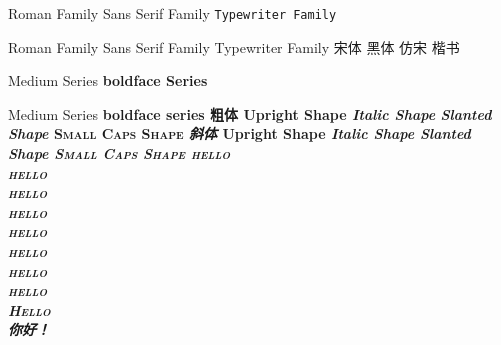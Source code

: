 \documentclass[a4paper, onneside]{ctexart}
\begin{document}
	\textrm{Roman Family}	%
	\textsf{Sans Serif Family}
	\texttt{Typewriter Family}
	
	\rmfamily Roman Family	%
	\sffamily Sans Serif Family
	\ttfamily Typewriter Family
	\songti 宋体
	\heiti 黑体
	\fangsong 仿宋
	\kaishu 楷书
	
	\textmd{Medium Series}	%
	\textbf{boldface Series} %
	
	\mdseries Medium Series
	\bfseries boldface series
	\textbf{粗体}
	\textup{Upright Shape}	%
	\textit{Italic Shape}	%
	\textsl{Slanted Shape}	%
	\textsc{Small Caps Shape}	%
	\textit{斜体}
	\upshape Upright Shape
	\itshape Italic Shape
	\slshape Slanted Shape
	\scshape Small Caps Shape
	{\tiny hello}\\
	{\scriptsize hello}\\
	{\small hello}\\
	{\normalsize hello}\\
	{\large hello}\\
	{\Large hello}\\
	{\LARGE hello}\\
	{\huge hello}\\
	{\Huge Hello}\\
	 你好！%
\end{document}
